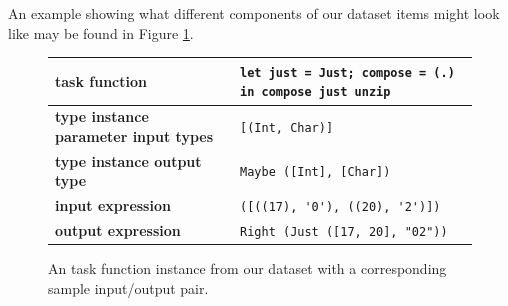 \documentclass{article}
\begin{document}
An example showing what different components of our dataset items might look like may be found in Figure \ref{fig:datasample}.

\begin{figure}
    \begin{tabular}{|l|l|} \hline
        \textbf{task function} & \verb|let just = Just; compose = (.) in compose just unzip| \\ \hline
        \textbf{type instance parameter input types} & \verb|[(Int, Char)]| \\ \hline
        \textbf{type instance output type} & \verb|Maybe ([Int], [Char])| \\ \hline
        \textbf{input expression} & \verb|([((17), '0'), ((20), '2')])| \\ \hline
        \textbf{output expression} & \verb|Right (Just ([17, 20], "02"))| \\ \hline
    \end{tabular}
    \caption{An task function instance from our dataset with a corresponding sample input/output pair.}
    \label{fig:datasample}
\end{figure}
\end{document}
